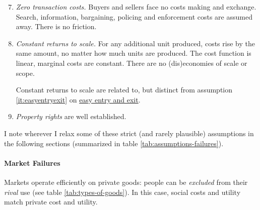 \begin{enumerate} \setcounter{enumi}{6}
	\item \emph{Zero transaction costs.} \label{it:zero-transaction-costs}
		Buyers and sellers face no costs making and exchange. Search, information, bargaining, policing and enforcement costs are assumed away. There is no friction.
	\item \emph{Constant returns to scale.} \label{it:constant-returns-to-scale} 
		For any additional unit produced, costs rise by the same amount, no matter how much units are produced. The cost function is linear, marginal costs are constant. There are no (dis)economies of scale or scope. 
	
		Constant returns to scale are related to, but distinct from assumption \ref{it:easyentryexit} on \hyperref[it:easy-entry-exit]{easy entry and exit}.
	\item \emph{Property rights} \label{it:property-rights} are well established. 
\end{enumerate}

I note wherever I relax some of these strict (and rarely plausible) assumptions in the following sections (summarized in table \ref{tab:assumptions-failures}).

	

\paragraph{Market Failures}  \label{sec:market-failures} Markets operate efficiently on private goods: people can be \emph{excluded} from their \emph{rival} use (see table \ref{tab:types-of-goods}). In this case, social costs and utility match private cost and utility. 

